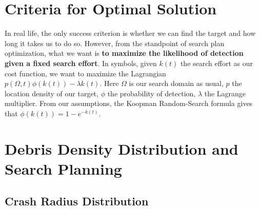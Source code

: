 \documentclass[12pt, letterpaper]{article}  %
\theoremstyle{definition}
\theoremstyle{remark}
\theoremstyle{plain}
\begin{document}

\section{Criteria for Optimal Solution}\label{sec:measure}


In real life, the only success criterion is whether we can find the target and how long it takes us to do so. However, from the standpoint of search plan optimization, what we want is \textbf{to maximize the likelihood of detection given a fixed search effort}. In symbols, given $k(t)$ the search effort as our cost function, we want to maximize the Lagrangian $p(\Omega,t)\phi(k(t))-\lambda k(t)$. Here $\Omega$ is our search domain as usual, $p$ the location density of our target, $\phi$ the probability of detection, $\lambda$ the Lagrange multiplier. From our assumptions, the Koopman Random-Search formula gives that $\phi(k(t)) = 1 - e^{-k(t)}$.


\section{Debris Density Distribution and Search Planning}\label{sec:mainmethod}


\subsection{Crash Radius Distribution}\label{subsec:crashr}
\end{document}
